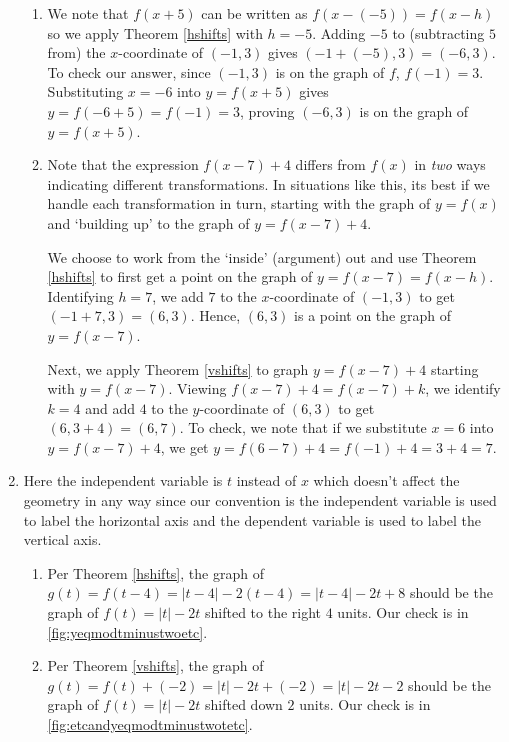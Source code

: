 \begin{ex}
\begin{enumerate}
\begin{enumerate}
 \item We note that $f(x+5)$ can be written as $f(x-(-5)) = f(x-h)$ so we apply Theorem \ref{hshifts} with $h=-5$.  Adding $-5$ to (subtracting $5$ from) the $x$-coordinate of  $(-1,3)$ gives $(-1+(-5), 3) = (-6,3)$.  To check our answer,  since $(-1,3)$ is on the graph of $f$, $f(-1) = 3$.  Substituting $x=-6$ into $y=f(x+5)$ gives $y=f(-6+5)=f(-1)=3$, proving $(-6,3)$ is on the graph of $y=f(x+5)$.
 
 \item Note that the expression $f(x-7)+4$ differs from $f(x)$ in \textit{two} ways indicating  different transformations. In situations like this, its best if we handle each transformation in turn, starting with the graph of  $y=f(x)$ and `building up' to the graph of $y = f(x-7)+4$.  
 
 We choose to work from the `inside' (argument) out and use Theorem \ref{hshifts} to first get a point on the graph of $y=f(x-7) = f(x-h)$. Identifying $h=7$, we add $7$ to the $x$-coordinate of $(-1,3)$ to get $(-1+7,3) = (6,3)$.  Hence, $(6,3)$ is a point on the graph of $y = f(x-7)$.  
 
 Next, we apply Theorem \ref{vshifts} to graph $y = f(x-7)+4$ starting with $y=f(x-7)$.  Viewing $f(x-7)+4 = f(x-7)+k$, we identify $k=4$ and add  $4$ to the $y$-coordinate of $(6,3)$ to get $(6,3+4) = (6,7)$.  To check, we note that if we substitute $x=6$ into $y = f(x-7)+4$, we get $y=f(6-7)+4 = f(-1)+4 = 3+4 =7$.
 
 \end{enumerate}
 
 \item  Here the independent variable is $t$ instead of $x$ which doesn't affect the geometry in any way since our convention is the independent variable is used to label the horizontal axis and the dependent variable is used to label the vertical axis.  
 
 \begin{enumerate}
 
\item  Per Theorem \ref{hshifts}, the graph of $g(t) = f(t-4) = |t-4|-2(t-4) = |t-4|-2t+8$ should be the graph of $f(t) = |t|-2t$ shifted to the right $4$ units. Our check is in \autoref{fig:yeqmodtminustwoetc}.
  
 \item Per Theorem \ref{vshifts},  the graph of $g(t) = f(t)+(-2) = |t|-2t+(-2) = |t|-2t-2$ should be the graph of  $f(t) = |t|-2t$ shifted down $2$ units. Our check is in \autoref{fig:etcandyeqmodtminustwotetc}.
 

\end{enumerate}
\end{enumerate}
\end{ex}
